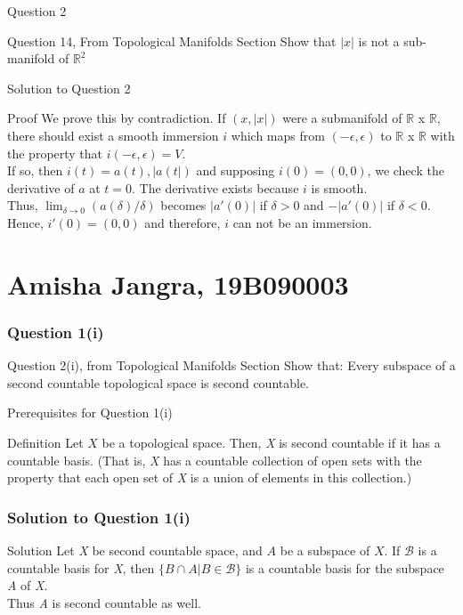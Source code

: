 \documentclass{beamer}
\newcommand{\R}{\mathbb{R}}
\begin{document}
\begin{frame}{Question 2}
\begin{block}{Question 14, From Topological Manifolds Section}
Show that $|x|$ is not a sub-manifold of $\R^{2}$
\end{block}
\end{frame}
\begin{frame}{Solution to Question 2}
    \begin{block}{Proof}
    We prove this by contradiction.
    If $(x,|x|)$ were a submanifold of $\mathbb{R}$ x $\mathbb{R}$, there should exist a smooth immersion \(i \) which maps from 
\( ( - \epsilon,  \epsilon) \) to $\mathbb{R}$ x $\mathbb{R}$ with the property that \( i( - \epsilon, \epsilon) = V\). \\
    If so, then \( i(t) = a(t), |a(t|)\) and supposing \( i(0) = (0,0) \), we check the derivative of \(a \) at \( t = 0\). The derivative exists because \( i\) is smooth. \\
    Thus, $\lim_{\delta \to 0} (a( \delta) / \delta) $ becomes \( |a'(0)| \) if \( \delta > 0 \) and  \( -|a'(0)| \) if \( \delta < 0 \). 
	Hence, \( i'(0) = (0,0) \) and therefore, \(i\) can not be an immersion. \qedsymbol
    \end{block}
\end{frame}
\section{Amisha Jangra, 19B090003}
\begin{frame}
\frametitle{Question 1(i)}
\begin{block}{Question 2(i), from Topological Manifolds Section}
Show that: Every subspace of a second countable topological space is second countable. 
\end{block}
\end{frame}


\begin{frame}{Prerequisites for Question 1(i)}
   \begin{block}{Definition} Let $X$ be a topological space. Then, \textit{X} is second countable if it has a countable basis. (That is, \textit{X} has a countable collection of open sets with the property that each open set of \textit{X} is a union of elements in this collection.)
   \end{block}
   \end{frame}
   \begin{frame}
   \frametitle{Solution to Question 1(i)}
   \begin{block}{Solution}
   Let \textit{X} be second countable space, and $A$ be a subspace of $X$. If $\mathscr{B}$ is a countable basis for \textit{X}, then $\{B \cap A | B \in \mathscr{B}\}$ is a countable basis for the subspace \textit{A} of \textit{X}.\\Thus \textit{A} is second countable as well. \qedsymbol
   \end{block}
  
\end{frame}
\end{document}

